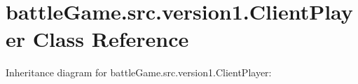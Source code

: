 \hypertarget{classbattleGame_1_1src_1_1version1_1_1ClientPlayer}{}\section{battle\+Game.\+src.\+version1.\+Client\+Player Class Reference}
\label{classbattleGame_1_1src_1_1version1_1_1ClientPlayer}


Inheritance diagram for battle\+Game.\+src.\+version1.\+Client\+Player\+:
